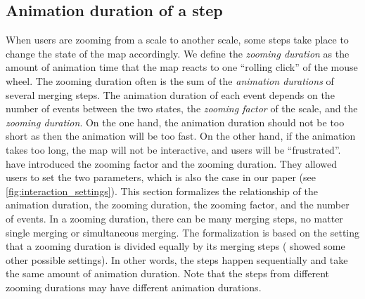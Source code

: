 \documentclass[twocolumn]{svjour3}          %
\begin{document}


\subsection{Animation duration of a step}
\label{sec:zooming_duration}

When users are zooming from a scale to another scale,
some steps take place to change the state of the map accordingly.
We define the \emph{zooming duration} as the amount of 
animation time that the map reacts to one ``rolling click'' of the mouse wheel.
The zooming duration often is the sum of 
the \emph{animation durations} of several merging steps.
The animation duration of each event depends on 
the number of events between the two states,
the \emph{zooming factor} of the scale, and 
the \emph{zooming duration}.
On the one hand, the animation duration should not be too short 
as then the animation will be too fast. 
On the other hand, if the animation takes too long, 
the map will not be interactive, and users will be ``frustrated''.
\citet[][]{Meijers2020Web} 
have introduced the zooming factor and the zooming duration.
They allowed users to set the two parameters,
which is also the case in our paper
(see \fig\ref{fig:interaction_settings}).
This section formalizes the relationship of the animation duration,
the zooming duration, the zooming factor, and the number of events.
In a zooming duration, there can be many merging steps,
no matter single merging or simultaneous merging.
The formalization is based on the setting that
a zooming duration is divided equally by its merging steps
(\citet[][]{Suba2017Thesis} showed some other possible settings).
In other words,
the steps happen sequentially and take the same amount of animation duration.
Note that the steps from different zooming durations 
may have different animation durations.
\end{document}
